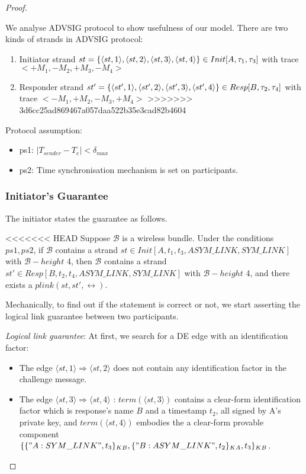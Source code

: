 \begin{flushleft}
\begin{flushleft}
\begin{Definition}
\begin{itemize}
\begin{Definition}
\begin{proof}
\begin{enumerate}
\begin{figure}
\end{figure}

We analyse ADVSIG protocol to show usefulness of our model. There are two kinds of strands in ADVSIG protocol:
\begin{enumerate}
\item Initiator strand $st =  \{\langle st, 1 \rangle,\langle st, 2 \rangle,\langle st, 3 \rangle,\langle st, 4 \rangle\}\\ \in Init[A,\tau_1,\tau_3]$ with trace $<+M_1, -M_2 , +M_3,-M_4>$
\item Responder strand $st' = \{\langle st', 1 \rangle,\langle st', 2 \rangle,\langle st', 3 \rangle,\langle st', 4 \rangle\} \\ \in Resp[B,\tau_2,\tau_4]$ with trace $<-M_1, +M_2 , -M_3,+M_4>$
>>>>>>> 3d6cc25ad869467a057daa522b35e3cad82b4604
\end{enumerate}

Protocol assumption: 
\begin{itemize}
\item ps1: $|T_{sender} - T_e| < \delta_{max}$
\item ps2: Time synchronisation mechanism is set on participants.
\end{itemize}

\subsubsection*{Initiator's Guarantee} 

The initiator states the guarantee as follows.

<<<<<<< HEAD
Suppose $\mathcal{B}$ is a wireless bundle. Under the conditions $ps1, ps2$, if $\mathcal{B}$ contains a strand $st \in Init[A,t_1,t_3,ASYM\_LINK, SYM\_LINK]$ with $\mathcal{B} -height$ 4, then $\mathcal{B}$ contains a strand $st' \in Resp[B,t_2,t_4,ASYM\_LINK, SYM\_LINK]$ with $\mathcal{B} -height$ 4, and there exists a $plink(st,st',\leftrightarrow)$. 

Mechanically, to find out if the statement is correct or not, we start asserting the logical link guarantee between two participants. 
 
\emph{Logical link guarantee}: At first, we search for a DE edge with an identification factor:
\begin{itemize}
\item The edge $\langle st, 1 \rangle \Rightarrow \langle st, 2 \rangle$ does not contain any identification factor in the challenge message. 
\item The edge $\langle st, 3 \rangle \Rightarrow \langle st, 4 \rangle$ : $term(\langle st, 3 \rangle)$ contains a clear-form identification factor which is response's name $B$ and a timestamp $t_2$, all signed by A's private key, and $term(\langle st, 4 \rangle)$ embodies the a clear-form provable component $\{\{ "A:SYM\_LINK", t_3\}_{KB} ,\{ "B:ASYM\_LINK",t_2\}_{KA} ,t_3\}_{KB}$.
\end{itemize}


\end{enumerate}
\end{proof}
\end{Definition}
\end{itemize}
\end{Definition}
\end{flushleft}
\end{flushleft}
